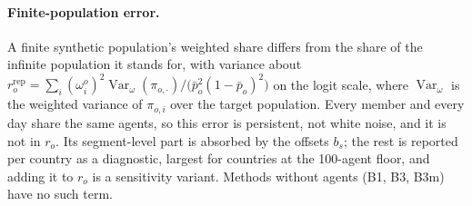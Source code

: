 \documentclass[10pt]{article}
\theoremstyle{remark}
\newcommand{\Var}{\operatorname{Var}}
\begin{document}
\paragraph{Finite-population error.} A finite synthetic population's weighted share differs from the share of the infinite population it stands for, with variance about $r^{\mathrm{rep}}_o=\sum_i(\omega^o_i)^2\Var_{\omega}(\pi_{o,\cdot})/\big(\bar p_o^2(1-\bar p_o)^2\big)$ on the logit scale, where $\Var_\omega$ is the weighted variance of $\pi_{o,i}$ over the target population. Every member and every day share the same agents, so this error is persistent, not white noise, and it is not in $r_o$. Its segment-level part is absorbed by the offsets $b_s$; the rest is reported per country as a diagnostic, largest for countries at the 100-agent floor, and adding it to $r_o$ is a sensitivity variant. Methods without agents (B1, B3, B3m) have no such term.
\end{document}
